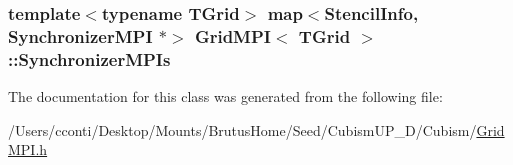 \subsubsection[{Synchronizer\+M\+P\+Is}]{\setlength{\rightskip}{0pt plus 5cm}template$<$typename T\+Grid$>$ map$<${\bf Stencil\+Info}, {\bf Synchronizer\+M\+P\+I} $\ast$$>$ {\bf Grid\+M\+P\+I}$<$ T\+Grid $>$\+::Synchronizer\+M\+P\+Is\hspace{0.3cm}{\ttfamily [protected]}}\label{class_grid_m_p_i_a2630fe6ea5a92bc46e122bce621143e5}


The documentation for this class was generated from the following file\+:\begin{DoxyCompactItemize}
\item 
/\+Users/cconti/\+Desktop/\+Mounts/\+Brutus\+Home/\+Seed/\+Cubism\+U\+P\+\_\+D/\+Cubism/\hyperlink{_grid_m_p_i_8h}{Grid\+M\+P\+I.\+h}\end{DoxyCompactItemize}
